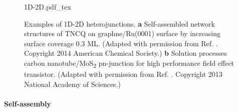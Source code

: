 \begin{figure}[h]
  \centering
  {1D-2D.pdf_tex}
  \caption{\label{fig:intro-1D-2D}%
    Examples of 1D-2D hetero\-junctions. \textbf{a} Self-assembled
    network structures of TNCQ on graphne/Ru(0001) surface by
    increasing surface coverage 0.3 ML. (Adapted with permission from
    Ref. \cite{Maccariello_2014_TCNQ_gr_Ru}. Copyright 2014 American
    Chemical Society.) \textbf{b} Solution processes carbon
    nano\-tube/MoS\textsubscript{2} pn-junction for high performance
    field effect transistor. (Adapted with permission from
    Ref. \cite{Jariwala_2013_CNT-mos2}. Copyright 2013 National
    Academy of Sciences.)}
\end{figure}

\paragraph{Self-assembly}

